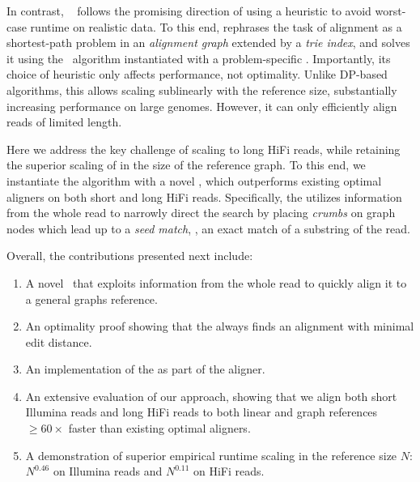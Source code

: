 In contrast, \astarix~\citep{ivanov2020astarix} follows the promising direction
of using a heuristic to avoid worst-case runtime on realistic data. To this end,
\astarix rephrases the task of alignment as a shortest-path problem in an
\emph{alignment graph} extended by a \emph{trie index}, and solves it using the
\A~algorithm instantiated with a problem-specific \prefixh. Importantly, its
choice of heuristic only affects performance, not optimality.
%
Unlike DP-based algorithms, this \prefixh allows scaling sublinearly with the
reference size, substantially increasing performance on large genomes. However,
it can only efficiently align reads of limited length.

%
Here we address the key challenge of scaling to long HiFi reads, while
retaining the superior scaling of \astarix in the size of the reference graph.
%
To this end, we instantiate the \A algorithm with a novel \seedh, which
outperforms existing optimal aligners on both short and long HiFi reads.
%
Specifically, the \seedh utilizes information from the whole read to narrowly
direct the \A search by placing \emph{crumbs} on graph nodes which lead up to a
\emph{seed match}, \ie, an exact match of a substring of the read.

Overall, the contributions presented next include:
%
\begin{enumerate} %
    \item A novel \A~\seedh that exploits information from the whole read to
    quickly align it to a general graphs reference.
    \item An optimality proof showing that the \seedh always finds an alignment
    with minimal edit distance.
	\item An implementation of the \seedh as part of the \astarix aligner.
    \item An extensive evaluation of our approach, showing that we align both
    short Illumina reads and long HiFi reads to both linear and graph references
    $\geq 60 \times$ faster than existing optimal aligners.
    \item A demonstration of superior empirical runtime scaling in the reference
    size $N$: $N^{0.46}$ on Illumina reads and $N^{0.11}$ on HiFi reads.
\end{enumerate}
